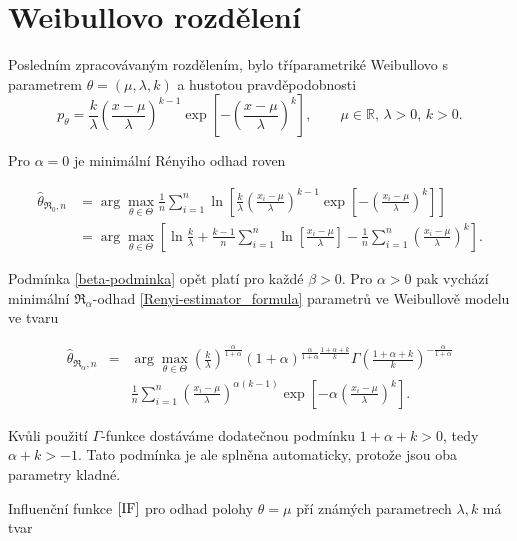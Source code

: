 \section{Weibullovo rozdělení} %

Posledním zpracovávaným rozdělením, bylo tříparametriké Weibullovo s parametrem $\theta = (\mu,\lambda,k)$ a hustotou pravděpodobnosti
\begin{equation}
	p_\theta =  \frac{k}{\lambda} \left( \frac{x-\mu}{\lambda} \right)^{k-1} \exp \left[ -\left( \frac{x-\mu}{\lambda} \right)^k \right], \qquad \mu \in \mathbb{R}, \, \lambda>0, \, k>0.
\end{equation}

\noindent Pro $\alpha = 0$ je minimální Rényiho odhad roven

\begin{align}
	\hat{\theta}_{\mathfrak{R}_0,n} & = \arg \max_{\theta \in \Theta} \frac{1}{n} \sum^n_{i=1} \ln \left[ \frac{k}{\lambda} \left( \frac{x_i-\mu}{\lambda} \right)^{k-1} 
	\exp \left[ -\left( \frac{x_i-\mu}{\lambda} \right)^k \right]\right] \nonumber \\
	&=\arg \max_{\theta \in \Theta}\left[ \ln \frac{k}{\lambda} + \frac{k-1}{n} \sum^n_{i=1} \ln \left[  \frac{x_i-\mu}{\lambda} \right] - 
	\frac{1}{n} \sum^n_{i=1} \left(  \frac{x_i-\mu}{\lambda} \right)^k \right].
\end{align}

\noindent Podmínka \ref{beta-podminka} opět platí pro každé $\beta>0$. Pro $\alpha>0$ pak vychází minimální $\mathfrak{R}_\alpha$-odhad \eqref{Renyi-estimator_formula} parametrů ve Weibullově modelu ve tvaru

\begin{eqnarray}
	\hat{\theta}_{\mathfrak{R}_\alpha,n} & = & \arg \max_{\theta \in \Theta} \left( \frac{k}{\lambda} \right)^\frac{\alpha}{1+\alpha} (1+\alpha)^{\frac{\alpha}{1+\alpha}\frac{1+\alpha+k}{k}} 
	\Gamma\left(\frac{1+\alpha+k}{k}\right)^{-\frac{\alpha}{1+\alpha}} \nonumber \\
	&& \frac{1}{n}\sum_{i=1}^n \left( \frac{x_i-\mu}{\lambda}\right)^{\alpha(k-1)} \exp\left[-\alpha \left(\frac{x_i-\mu}{\lambda}\right)^k\right].
\end{eqnarray}

\noindent Kvůli použití $\Gamma$-funkce dostáváme dodatečnou podmínku $1+\alpha+k>0$, tedy $\alpha + k > -1$. Tato podmínka je ale splněna automaticky, protože jsou oba parametry kladné. 

Influenční funkce $\eqref{IF}$ pro odhad polohy $\theta = \mu$ pří známých parametrech $\lambda, k $  má tvar

